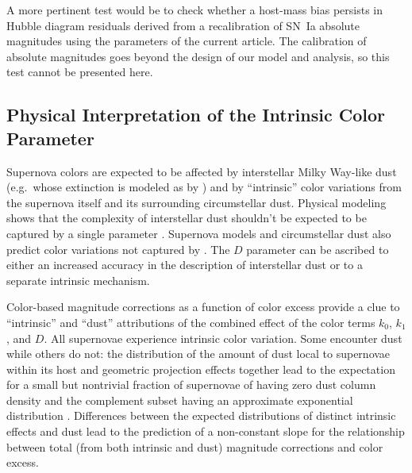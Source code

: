 \documentclass{aastex61}   	%
\begin{document}
A more pertinent test 
would be to check whether
a host-mass bias persists in Hubble diagram residuals
derived from a recalibration of SN~Ia absolute magnitudes using the parameters of the current article.
The calibration of absolute magnitudes goes beyond the design of our model and analysis, so this test
cannot be presented here.


\subsection{Physical Interpretation of the Intrinsic Color Parameter}
\label{interpret:sec}
Supernova colors are expected to be affected by interstellar Milky Way-like dust   (e.g.\ whose extinction is modeled as by  )
and by ``intrinsic'' color variations from the supernova itself and its surrounding circumstellar dust. Physical modeling
shows that the complexity of interstellar dust shouldn't be expected to be captured by a single parameter \citep{2015ApJ...807L..26G,
2017ApJ...836...13H}. Supernova models \citep[e.g.][]{2007ApJ...662..487W,2013MNRAS.436..333S,2014MNRAS.441..532D,2015MNRAS.454.2549B,
2017ApJ...846...58H} and circumstellar dust \citep{2005ApJ...635L..33W,
2008ApJ...686L.103G} also predict color variations not  captured
by  .
The $D$ parameter
can be ascribed to either an increased accuracy in the description of interstellar dust or to a separate intrinsic mechanism.  

Color-based magnitude corrections as a function of color excess provide a clue to ``intrinsic'' and ``dust'' attributions of
the combined effect of the color terms $k_0$, $k_1$, and $D$.  
All supernovae experience  intrinsic color variation.
Some encounter dust while others do not:  the distribution of the amount of  dust local to  supernovae within its host and
geometric projection effects together lead to the expectation for a small but nontrivial fraction  of supernovae of having zero
dust column density and the
complement subset having an approximate exponential distribution \citep{1998ApJ...502..177H}.
Differences between the expected distributions of
distinct intrinsic effects and dust lead to the prediction of a non-constant slope for the relationship between
total (from both intrinsic and dust)  magnitude corrections and color excess.  
\end{document}
